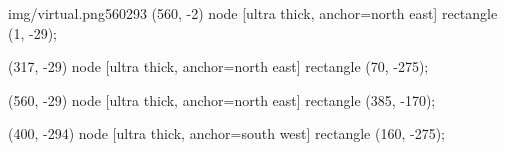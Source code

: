 \contourlength{1.1pt}
\begin{interface}[\textwidth]{img/virtual.png}{560}{293}
    (560, -2) node [ultra thick, anchor=north east] {
      \bfseries
    }
    rectangle (1, -29);
  
    (317, -29) node [ultra thick, anchor=north east] {
        \bfseries
      }
    rectangle (70, -275);
  
    (560, -29) node [ultra thick, anchor=north east] {
      \bfseries
    }
    rectangle (385, -170);

    (400, -294) node [ultra thick, anchor=south west] {
      \bfseries
    }
    rectangle (160, -275);
\end{interface}
